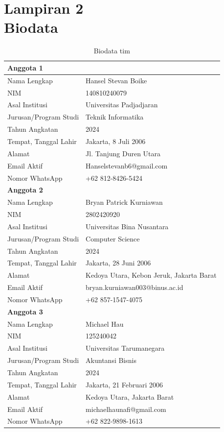\section*{Lampiran 2\\Biodata}

\begin{table}[H]
\begin{tabularx}{\textwidth}{|l|X|}
\hline
\multicolumn{2}{|l|}{\textbf{Anggota 1}} \\
\hline
Nama Lengkap & Hansel Stevan Boike \\
\hline
NIM & 140810240079 \\
\hline
Asal Institusi & Universitas Padjadjaran \\
\hline
Jurusan/Program Studi & Teknik Informatika \\
\hline
Tahun Angkatan & 2024 \\
\hline
Tempat, Tanggal Lahir & Jakarta, 8 Juli 2006 \\
\hline
Alamat & Jl. Tanjung Duren Utara \\
\hline
Email Aktif & Hanselstevanb6@gmail.com \\
\hline
Nomor WhatsApp & +62 812-8426-5424 \\
\hline
\multicolumn{2}{|l|}{\textbf{Anggota 2}} \\
\hline
Nama Lengkap & Bryan Patrick Kurniawan \\
\hline
NIM & 2802420920 \\
\hline
Asal Institusi & Universitas Bina Nusantara \\
\hline
Jurusan/Program Studi & Computer Science \\
\hline
Tahun Angkatan & 2024 \\
\hline
Tempat, Tanggal Lahir & Jakarta, 28 Juni 2006 \\
\hline
Alamat & Kedoya Utara, Kebon Jeruk, Jakarta Barat \\
\hline
Email Aktif & bryan.kurniawan003@binus.ac.id \\
\hline
Nomor WhatsApp & +62 857-1547-4075 \\
\hline
\multicolumn{2}{|l|}{\textbf{Anggota 3}} \\
\hline
Nama Lengkap & Michael Hau \\
\hline
NIM & 125240042 \\
\hline
Asal Institusi & Universitas Tarumanegara \\
\hline
Jurusan/Program Studi & Akuntansi Bisnis \\
\hline
Tahun Angkatan & 2024 \\
\hline
Tempat, Tanggal Lahir & Jakarta, 21 Februari 2006 \\
\hline
Alamat & Kedoya Utara, Jakarta Barat \\
\hline
Email Aktif & michaelhaunafi@gmail.com \\
\hline
Nomor WhatsApp & +62 822-9898-1613 \\
\hline
\end{tabularx}
\caption{Biodata tim}
\end{table}
